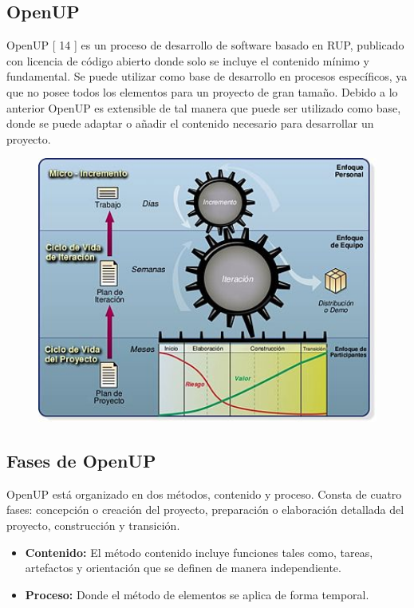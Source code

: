 \subsection{OpenUP}
OpenUP [ 14 ] es un proceso de desarrollo de software basado en RUP, publicado con licencia de código abierto donde solo se incluye el contenido mínimo y fundamental. 
Se puede utilizar como base de desarrollo en procesos específicos, ya que no posee todos los elementos para un proyecto de gran tamaño. Debido a lo anterior OpenUP 
es extensible de tal manera que puede ser utilizado como base, donde se puede adaptar o añadir el contenido necesario para desarrollar un proyecto.\\
\begin{figure}[H]
	\begin{center}
 		\includegraphics[width = 1\textwidth]{v2/images/image47.png}
	\end{center} 
\end{figure}

\subsection{Fases de OpenUP}
OpenUP está organizado en dos métodos, contenido y proceso. Consta de cuatro fases: concepción o creación del proyecto, preparación o elaboración detallada del proyecto, 
construcción y transición.
\begin{itemize}
  \item \textbf{Contenido:} El método contenido incluye funciones tales como, tareas, artefactos y orientación que se definen de manera independiente.
  \item \textbf{Proceso:}  Donde el método de elementos se aplica de forma temporal.  
\end{itemize}

